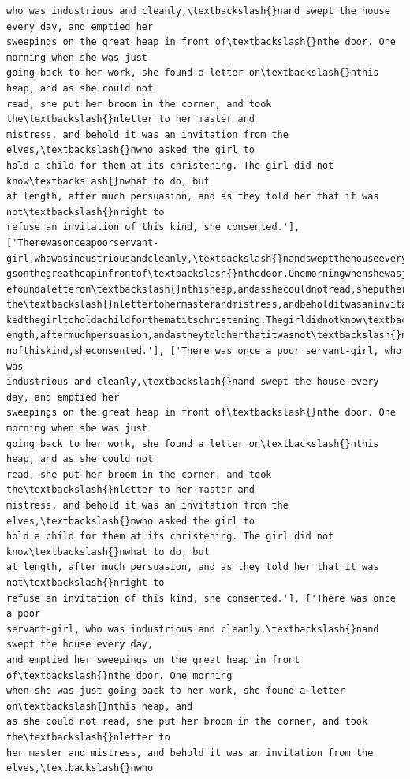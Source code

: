 \documentclass[11pt]{article}
\begin{document}
\begin{Verbatim}[commandchars=\\\{\}]
who was industrious and cleanly,\textbackslash{}nand swept the house every day, and emptied her
sweepings on the great heap in front of\textbackslash{}nthe door. One morning when she was just
going back to her work, she found a letter on\textbackslash{}nthis heap, and as she could not
read, she put her broom in the corner, and took the\textbackslash{}nletter to her master and
mistress, and behold it was an invitation from the elves,\textbackslash{}nwho asked the girl to
hold a child for them at its christening. The girl did not know\textbackslash{}nwhat to do, but
at length, after much persuasion, and as they told her that it was not\textbackslash{}nright to
refuse an invitation of this kind, she consented.'], ['Therewasonceapoorservant-
girl,whowasindustriousandcleanly,\textbackslash{}nandsweptthehouseeveryday,andemptiedhersweepin
gsonthegreatheapinfrontof\textbackslash{}nthedoor.Onemorningwhenshewasjustgoingbacktoherwork,sh
efoundaletteron\textbackslash{}nthisheap,andasshecouldnotread,sheputherbroominthecorner,andtook
the\textbackslash{}nlettertohermasterandmistress,andbeholditwasaninvitationfromtheelves,\textbackslash{}nwhoas
kedthegirltoholdachildforthematitschristening.Thegirldidnotknow\textbackslash{}nwhattodo,butatl
ength,aftermuchpersuasion,andastheytoldherthatitwasnot\textbackslash{}nrighttorefuseaninvitatio
nofthiskind,sheconsented.'], ['There was once a poor servant-girl, who was
industrious and cleanly,\textbackslash{}nand swept the house every day, and emptied her
sweepings on the great heap in front of\textbackslash{}nthe door. One morning when she was just
going back to her work, she found a letter on\textbackslash{}nthis heap, and as she could not
read, she put her broom in the corner, and took the\textbackslash{}nletter to her master and
mistress, and behold it was an invitation from the elves,\textbackslash{}nwho asked the girl to
hold a child for them at its christening. The girl did not know\textbackslash{}nwhat to do, but
at length, after much persuasion, and as they told her that it was not\textbackslash{}nright to
refuse an invitation of this kind, she consented.'], ['There was once a poor
servant-girl, who was industrious and cleanly,\textbackslash{}nand swept the house every day,
and emptied her sweepings on the great heap in front of\textbackslash{}nthe door. One morning
when she was just going back to her work, she found a letter on\textbackslash{}nthis heap, and
as she could not read, she put her broom in the corner, and took the\textbackslash{}nletter to
her master and mistress, and behold it was an invitation from the elves,\textbackslash{}nwho

\end{Verbatim}
\end{document}

